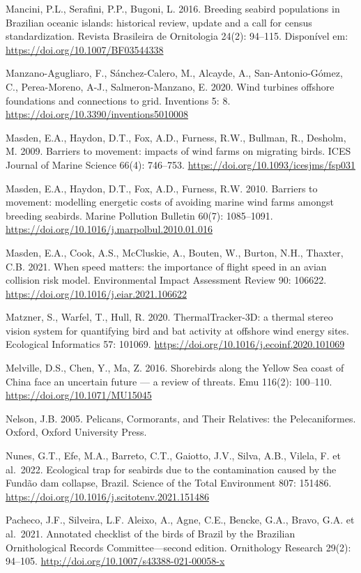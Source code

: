 \documentclass[
  oneside]{scrbook}
\begin{document}
Mancini, P.L., Serafini, P.P., Bugoni, L. 2016. Breeding seabird populations in Brazilian oceanic islands: historical review, update and a call for census standardization. Revista Brasileira de Ornitologia 24(2): 94--115. Disponível em: \url{https://doi.org/10.1007/BF03544338}

Manzano-Agugliaro, F., Sánchez-Calero, M., Alcayde, A., San-Antonio-Gómez, C., Perea-Moreno, A-J., Salmeron-Manzano, E. 2020. Wind turbines offshore foundations and connections to grid. Inventions 5: 8. \url{https://doi.org/10.3390/inventions5010008}

Masden, E.A., Haydon, D.T., Fox, A.D., Furness, R.W., Bullman, R., Desholm, M. 2009. Barriers to movement: impacts of wind farms on migrating birds. ICES Journal of Marine Science 66(4): 746--753. \url{https://doi.org/10.1093/icesjms/fsp031}

Masden, E.A., Haydon, D.T., Fox, A.D., Furness, R.W. 2010. Barriers to movement: modelling energetic costs of avoiding marine wind farms amongst breeding seabirds. Marine Pollution Bulletin 60(7): 1085--1091. \url{https://doi.org/10.1016/j.marpolbul.2010.01.016}

Masden, E.A., Cook, A.S., McCluskie, A., Bouten, W., Burton, N.H., Thaxter, C.B. 2021. When speed matters: the importance of flight speed in an avian collision risk model. Environmental Impact Assessment Review 90: 106622. \url{https://doi.org/10.1016/j.eiar.2021.106622}

Matzner, S., Warfel, T., Hull, R. 2020. ThermalTracker-3D: a thermal stereo vision system for quantifying bird and bat activity at offshore wind energy sites. Ecological Informatics 57: 101069. \url{https://doi.org/10.1016/j.ecoinf.2020.101069}

Melville, D.S., Chen, Y., Ma, Z. 2016. Shorebirds along the Yellow Sea coast of China face an uncertain future --- a review of threats. Emu 116(2): 100--110. \url{https://doi.org/10.1071/MU15045}

Nelson, J.B. 2005. Pelicans, Cormorants, and Their Relatives: the Pelecaniformes. Oxford, Oxford University Press.

Nunes, G.T., Efe, M.A., Barreto, C.T., Gaiotto, J.V., Silva, A.B., Vilela, F. et al.~2022. Ecological trap for seabirds due to the contamination caused by the Fundão dam collapse, Brazil. Science of the Total Environment 807: 151486. \url{https://doi.org/10.1016/j.scitotenv.2021.151486}

Pacheco, J.F., Silveira, L.F. Aleixo, A., Agne, C.E., Bencke, G.A., Bravo, G.A. et al.~2021. Annotated checklist of the birds of Brazil by the Brazilian Ornithological Records Committee---second edition. Ornithology Research 29(2): 94--105. \url{http://doi.org/10.1007/s43388-021-00058-x}
\end{document}
